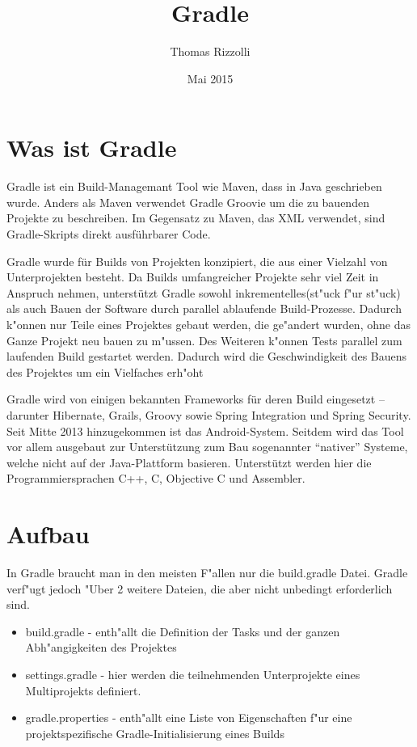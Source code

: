 \documentclass[a4paper]{article}
\title{Gradle}
\author{Thomas Rizzolli}
\date{Mai 2015}
\begin{document}
\maketitle

\section{Was ist Gradle}
Gradle ist ein Build-Managemant Tool wie Maven, dass in Java geschrieben wurde. Anders als Maven verwendet Gradle Groovie um die zu bauenden Projekte zu beschreiben. Im Gegensatz zu Maven, das XML verwendet, sind Gradle-Skripts direkt ausführbarer Code.

Gradle wurde für Builds von Projekten konzipiert, die aus einer Vielzahl von Unterprojekten besteht.
Da Builds umfangreicher Projekte sehr viel Zeit in Anspruch nehmen, unterstützt Gradle sowohl inkrementelles(st"uck f"ur st"uck) als auch Bauen der Software durch parallel ablaufende Build-Prozesse. Dadurch k"onnen nur Teile eines Projektes gebaut werden, die ge"andert wurden, ohne das Ganze Projekt neu bauen zu m"ussen. Des Weiteren k"onnen Tests parallel zum laufenden Build gestartet werden. Dadurch wird die Geschwindigkeit des Bauens des Projektes um ein Vielfaches erh"oht

Gradle wird von einigen bekannten Frameworks für deren Build eingesetzt – darunter Hibernate, Grails, Groovy sowie Spring Integration und Spring Security. Seit Mitte 2013 hinzugekommen ist das Android-System. Seitdem wird das Tool vor allem ausgebaut zur Unterstützung zum Bau sogenannter ``nativer'' Systeme, welche nicht auf der Java-Plattform basieren. Unterstützt werden hier die Programmiersprachen C++, C, Objective C und Assembler.

\section{Aufbau}
In Gradle braucht man in den meisten F"allen nur die build.gradle Datei. Gradle verf"ugt jedoch "Uber 2 weitere Dateien, die aber nicht unbedingt erforderlich sind.
\begin{itemize}
\item build.gradle - enth"allt die Definition der Tasks und der ganzen Abh"angigkeiten des Projektes
\item settings.gradle - hier werden die teilnehmenden Unterprojekte eines Multiprojekts definiert.
\item gradle.properties - enth"allt eine Liste von Eigenschaften f"ur eine projektspezifische Gradle-Initialisierung eines Builds
\end{itemize}
\end{document}
